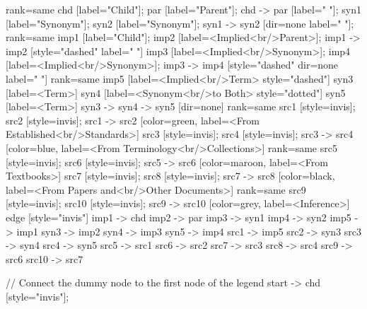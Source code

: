 \documentclass{article}
\begin{document}
{{    {
        rank=same
        chd [label="Child"];
        par [label="Parent"];
        chd -> par [label="                "];
        syn1 [label="Synonym"];
        syn2 [label="Synonym"];
        syn1 -> syn2 [dir=none label="                "];
    }
    {
        rank=same
        imp1 [label="Child"];
        imp2 [label=<Implied<br/>Parent>];
        imp1 -> imp2 [style="dashed" label="                "]
        imp3 [label=<Implied<br/>Synonym>];
        imp4 [label=<Implied<br/>Synonym>];
        imp3 -> imp4 [style="dashed" dir=none label="                "]
    }
    {
        rank=same
        imp5 [label=<Implied<br/>Term> style="dashed"]
        syn3 [label=<Term>]
        syn4 [label=<Synonym<br/>to Both> style="dotted"]
        syn5 [label=<Term>]
        syn3 -> syn4 -> syn5 [dir=none]
    }
{
rank=same
src1 [style=invis];
src2 [style=invis];
src1 -> src2 [color=green, label=<From Established<br/>Standards>]
src3 [style=invis];
src4 [style=invis];
src3 -> src4 [color=blue, label=<From Terminology<br/>Collections>]
}
{
rank=same
src5 [style=invis];
src6 [style=invis];
src5 -> src6 [color=maroon, label=<From Textbooks>]
src7 [style=invis];
src8 [style=invis];
src7 -> src8 [color=black, label=<From Papers and<br/>Other Documents>]
}
{
rank=same
src9 [style=invis];
src10 [style=invis];
src9 -> src10 [color=grey, label=<Inference>]
}
edge [style="invis"]
imp1 -> chd
imp2 -> par
imp3 -> syn1
imp4 -> syn2
imp5 -> imp1
syn3 -> imp2
syn4 -> imp3
syn5 -> imp4
src1 -> imp5
src2 -> syn3
src3 -> syn4
src4 -> syn5
src5 -> src1
src6 -> src2
src7 -> src3
src8 -> src4
src9 -> src6
src10 -> src7
}

// Connect the dummy node to the first node of the legend
start -> chd [style="invis"];
}
\end{document}
